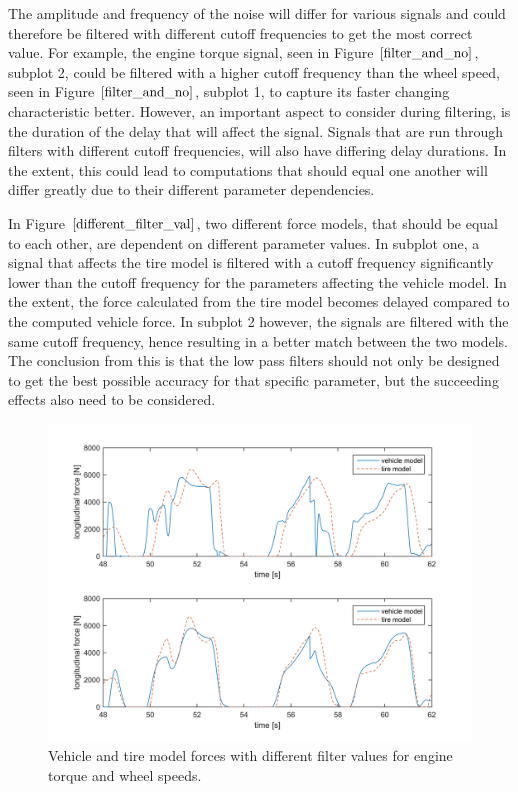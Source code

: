 The amplitude and frequency of the noise will differ for various signals and could therefore be filtered with different cutoff frequencies to get the most correct value. For example, the engine torque signal, seen in Figure $ \ref{filter_and_no} $, subplot 2, could be filtered with a higher cutoff frequency than the wheel speed, seen in Figure $ \ref{filter_and_no} $, subplot 1, to capture its faster changing characteristic better. However, an important aspect to consider during filtering, is the duration of the delay that will affect the signal. Signals that are run through filters with different cutoff frequencies, will also have differing delay durations. In the extent, this could lead to computations that should equal one another will differ greatly due to their different parameter dependencies. 

In Figure $ \ref{different_filter_val} $, two different force models, that should be equal to each other, are dependent on different parameter values. In subplot one, a signal that affects the tire model is filtered with a cutoff frequency significantly lower than the cutoff frequency for the parameters affecting the vehicle model. In the extent, the force calculated from the tire model becomes delayed compared to the computed vehicle force. In subplot 2 however, the signals are filtered with the same cutoff frequency, hence resulting in a better match between the two models. The conclusion from this is that the low pass filters should not only be designed to get the best possible accuracy for that specific parameter, but the succeeding effects also need to be considered.

\begin{figure}[h]
	\centering
	\includegraphics[width=1.0\textwidth]{Pictures/different_filter_val}
	\caption {Vehicle and tire model forces with different filter values for engine torque and wheel speeds.}
	\label{different_filter_val}
\end{figure}

